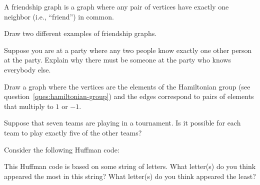 \documentclass[exam, 12pt]{wvwcdocs}
\begin{document}
\begin{questions}
\begin{parts}
          \end{parts}

          \question[10]\label{ques:friendship-graph}
          A friendship graph is a graph where any pair of vertices have exactly one neighbor (i.e., ``friend'') in common.
          \begin{parts}
              \qpart\label{part:examples-friendship}
              Draw two different examples of friendship graphs.


              \qpart\label{part:friendship-party}
              Suppose you are at a party where any two people know exactly one other person at the party.
              Explain why there must be someone at the party who knows everybody else.


          \end{parts}

          \question[10]\label{ques:name-graph}
          Draw a graph where the vertices are the elements of the Hamiltonian group (see question~\ref{ques:hamiltonian-group}) and the edges correspond to pairs of elements that multiply to \( 1 \) or \( -1 \).


          \question[10]\label{ques:tournaments}
          Suppose that seven teams are playing in a tournament.
          Is it possible for each team to play exactly five of the other teams?


          \question[10]\label{ques:huffman-code}  Consider the following Huffman code:
          \begin{center}
          \end{center}
          \begin{parts}
              \qpart\label{part:frequency}
              This Huffman code is based on some string of letters.
              What letter(s) do you think appeared the most in this string?
              What letter(s) do you think appeared the least?



\end{parts}
\end{questions}
\end{document}
